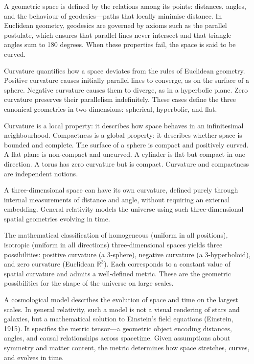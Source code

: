 A geometric space is defined by the relations among its points: distances, angles, and the behaviour of geodesics—paths that locally minimise distance. In Euclidean geometry, geodesics are governed by axioms such as the parallel postulate, which ensures that parallel lines never intersect and that triangle angles sum to 180 degrees. When these properties fail, the space is said to be curved.

Curvature quantifies how a space deviates from the rules of Euclidean geometry. Positive curvature causes initially parallel lines to converge, as on the surface of a sphere. Negative curvature causes them to diverge, as in a hyperbolic plane. Zero curvature preserves their parallelism indefinitely. These cases define the three canonical geometries in two dimensions: spherical, hyperbolic, and flat.

Curvature is a local property: it describes how space behaves in an infinitesimal neighbourhood. Compactness is a global property: it describes whether space is bounded and complete. The surface of a sphere is compact and positively curved. A flat plane is non-compact and uncurved. A cylinder is flat but compact in one direction. A torus has zero curvature but is compact. Curvature and compactness are independent notions.

A three-dimensional space can have its own curvature, defined purely through internal measurements of distance and angle, without requiring an external embedding. General relativity models the universe using such three-dimensional spatial geometries evolving in time.

The mathematical classification of homogeneous (uniform in all positions), isotropic (uniform in all directions) three-dimensional spaces yields three possibilities: positive curvature (a 3-sphere), negative curvature (a 3-hyperboloid), and zero curvature (Euclidean $\mathbb{R}^3$). Each corresponds to a constant value of spatial curvature and admits a well-defined metric. These are the geometric possibilities for the shape of the universe on large scales.

A cosmological model describes the evolution of space and time on the largest scales. In general relativity, such a model is not a visual rendering of stars and galaxies, but a mathematical solution to Einstein’s field equations (Einstein, 1915). It specifies the metric tensor—a geometric object encoding distances, angles, and causal relationships across spacetime. Given assumptions about symmetry and matter content, the metric determines how space stretches, curves, and evolves in time.

